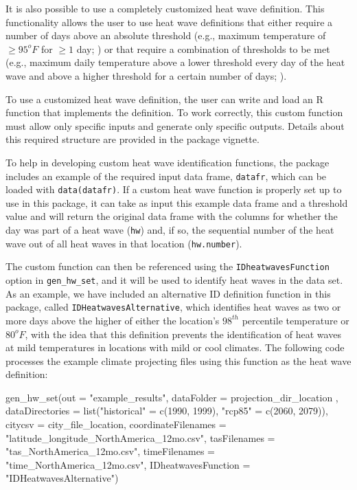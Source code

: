 It is also possible to use a completely customized heat wave definition.
This functionality allows the user to use heat wave definitions that
either require a number of days above an absolute threshold (e.g.,
maximum temperature of \(\ge95^oF\) for \(\ge1\) day;
\citet{kent2014heat, tan2007heat}) or that require a combination of
thresholds to be met (e.g., maximum daily temperature above a lower
threshold every day of the heat wave and above a higher threshold for a
certain number of days; \citet{kent2014heat, peng2011toward}).

To use a customized heat wave definition, the user can write and load an
R function that implements the definition. To work correctly, this
custom function must allow only specific inputs and generate only
specific outputs. Details about this required structure are provided in
the  package vignette.

To help in developing custom heat wave identification functions, the
package includes an example of the required input data frame,
\texttt{datafr}, which can be loaded with \texttt{data(datafr)}. If a
custom heat wave function is properly set up to use in this package, it
can take as input this example data frame and a threshold value and will
return the original data frame with the columns for whether the day was
part of a heat wave (\texttt{hw}) and, if so, the sequential number of
the heat wave out of all heat waves in that location
(\texttt{hw.number}).

The custom function can then be referenced using the
\texttt{IDheatwavesFunction} option in \texttt{gen\_hw\_set}, and it
will be used to identify heat waves in the data set. As an example, we
have included an alternative ID definition function in this package,
called \texttt{IDHeatwavesAlternative}, which identifies heat waves as
two or more days above the higher of either the location's \(98^{th}\)
percentile temperature or \(80^{o}F\), with the idea that this
definition prevents the identification of heat waves at mild
temperatures in locations with mild or cool climates. The following code
processes the example climate projecting files using this function as
the heat wave definition:

\begin{Schunk}
\begin{Sinput}
gen_hw_set(out = "example_results",
           dataFolder = projection_dir_location ,
           dataDirectories = list("historical" = c(1990, 1999),
                                        "rcp85" = c(2060, 2079)),
           citycsv = city_file_location,
           coordinateFilenames = "latitude_longitude_NorthAmerica_12mo.csv",
           tasFilenames = "tas_NorthAmerica_12mo.csv",
           timeFilenames = "time_NorthAmerica_12mo.csv",
           IDheatwavesFunction = "IDHeatwavesAlternative")
\end{Sinput}
\end{Schunk}

